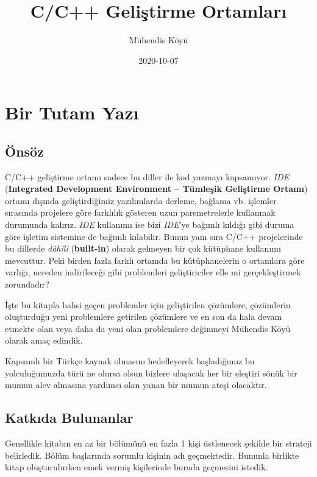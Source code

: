 \documentclass[
]{book}
\title{C/C++ Geliştirme Ortamları}
\author{Mühendis Köyü}
\date{2020-10-07}
\begin{document}
\maketitle

{
\setcounter{tocdepth}{1}
\tableofcontents
}
\hypertarget{bir-tutam-yazux131}{%
\chapter*{Bir Tutam Yazı}\label{bir-tutam-yazux131}}

\hypertarget{uxf6nsuxf6z}{%
\section*{Önsöz}\label{uxf6nsuxf6z}}

C/C++ geliştirme ortamı sadece bu diller ile kod yazmayı kapsamıyor. \emph{IDE} (\textbf{Integrated Development Environment -- Tümleşik Geliştirme Ortamı}) ortamı dışında geliştirdiğimiz yazılımlarda derleme, bağlama vb. işlemler sırasında projelere göre farklılık gösteren uzun paremetrelerle kullanmak durumunda kalırız. \emph{IDE} kullanımı ise bizi \emph{IDE}'ye bağımlı kıldığı gibi duruma göre işletim sistemine de bağımlı kılabilir. Bunun yanı sıra C/C++ projelerinde bu dillerde \emph{dâhili} (\textbf{built-in}) olarak gelmeyen bir çok kütüphane kullanımı mevcuttur. Peki birden fazla farklı ortamda bu kütüphanelerin o ortamlara göre varlığı, nereden indirileceği gibi problemleri geliştiriciler elle mi gerçekleştirmek zorundadır?

İşte bu kitapla bahsi geçen problemler için geliştirilen çözümlere, çözümlerin oluşturduğu yeni problemlere getirilen çözümlere ve en son da hala devam etmekte olan veya daha da yeni olan problemlere değinmeyi Mühendis Köyü olarak amaç edindik.

Kapsamlı bir Türkçe kaynak olmasını hedefleyerek başladığımız bu yolculuğumuzda türü ne olursa olsun bizlere ulaşacak her bir eleştiri sönük bir mumun alev almasına yardımcı olan yanan bir mumun ateşi olacaktır.

\hypertarget{katkux131da-bulunanlar}{%
\section*{Katkıda Bulunanlar}\label{katkux131da-bulunanlar}}

Genellikle kitabın en az bir bölümünü en fazla 1 kişi üstlenecek şekilde bir strateji belirledik. Bölüm başlarında sorumlu kişinin adı geçmektedir. Bununla birlikte kitap oluşturulurken emek vermiş kişilerinde burada geçmesini istedik.
\end{document}
